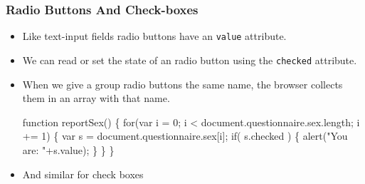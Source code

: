 \documentclass[svgnames,handout]{beamer}
\begin{document}
\begin{frame}[fragile] 
\frametitle{Radio Buttons And Check-boxes}

\begin{itemize}
\item Like text-input fields radio buttons have an \texttt{value} attribute.
\item We can read or set the state of an radio button using the
  \texttt{checked} attribute.
\item When we give a group radio buttons the same name, the browser
  collects them in an array with that name.
\begin{semiverbatim}\footnotesize{}
 function reportSex() \{
    for(var i = 0; i < document.questionnaire.sex.length; i += 1) \{
      var s = document.questionnaire.sex[i];
      if( s.checked ) \{
         alert("You are: "+s.value);
      \}
    \}
 \}    
\end{semiverbatim}
\item And similar for check boxes
\end{itemize}

  
\end{frame}
\end{document}
